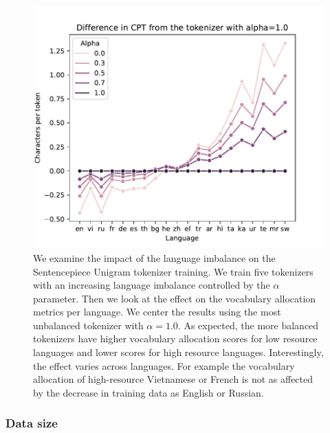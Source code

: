 \begin{figure}[H]
    \centering
    \includegraphics[width=\textwidth]{img/results/cpt_vs_alpha.pdf}
    \caption{We examine the impact of the language imbalance on the Sentencepiece Unigram tokenizer training. We train five tokenizers with an increasing language imbalance controlled by the $\alpha$ parameter. Then we look at the effect on the vocabulary allocation metrics per language. We center the results using the most unbalanced tokenizer with $\alpha=1.0$. As expected, the more balanced tokenizers have higher vocabulary allocation scores for low resource languages and lower scores for high resource languages. Interestingly, the effect varies across languages. For example the vocabulary allocation of high-resource Vietnamese or French is not as affected by the decrease in training data as English or Russian. }
    \label{fig:data_balance_vs_allocation_per_lang}
\end{figure}

\subsubsection{Data size}

